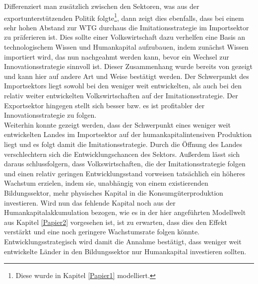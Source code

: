 Differenziert man zus{\"a}tzlich zwischen den Sektoren, was aus der exportunterst{\"u}tzenden Politik folgte\footnote{Diese wurde in Kapitel \ref{Papier1} modelliert.}, dann zeigt dies ebenfalls, dass bei einem sehr hohen Abstand zur WTG durchaus die Imitationsstrategie im Importsektor zu pr{\"a}ferieren ist. Dies sollte einer Volkswirtschaft dazu verhelfen eine Basis an technologischem Wissen und Humankapital aufzubauen, indem zun{\"a}chst Wissen importiert wird, das nun nachgeahmt werden kann, bevor ein Wechsel zur Innovationsstrategie sinnvoll ist. Dieser Zusammenhang wurde bereits von \citet{Glass.1999} gezeigt und kann hier auf andere Art und Weise best{\"a}tigt werden. Der Schwerpunkt des Importsektors liegt sowohl bei den weniger weit entwickelten, als auch bei den relativ weiter entwickelten Volkswirtschaften auf der Imitationsstrategie. Der Exportsektor hingegen stellt sich besser bzw. es ist profitabler der Innovationsstrategie zu folgen.\\ 


Weiterhin konnte gezeigt werden, dass der Schwerpunkt eines weniger weit entwickelten Landes im Importsektor auf der humankapitalintensiven Produktion liegt und es folgt damit die Imitationsstrategie. Durch die {\"O}ffnung des Landes verschlechtern sich die Entwicklungschancen des Sektors. 
Au{\ss}erdem l{\"a}sst sich daraus schlussfolgern, dass Volkswirtschaften, die der Imitationsstrategie folgen und einen relativ geringen Entwicklungsstand vorweisen tats{\"a}chlich ein h{\"o}heres Wachstum erzielen, indem sie, unabh{\"a}ngig von einem existierenden Bildungssektor, mehr physisches Kapital in die Konsumg{\"u}terproduktion investieren. Wird nun das fehlende Kapital noch aus der Humankapitalakkumulation bezogen, wie es in der hier angef{\"u}hrten Modellwelt aus Kapitel \ref{Papier2} vorgesehen ist, ist zu erwarten, dass dies den Effekt verst{\"a}rkt und eine noch geringere Wachstumsrate folgen k{\"o}nnte. Entwicklungsstrategisch wird damit die Annahme best{\"a}tigt, dass weniger weit entwickelte L{\"a}nder in den Bildungssektor nur Humankapital investieren sollten.\newline


